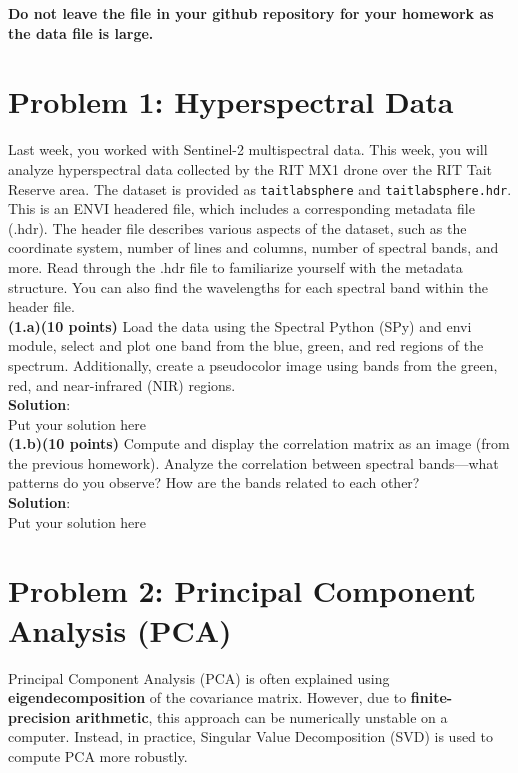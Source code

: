 \documentclass[12pt]{article}
\begin{document}
\noindent\textbf{Do not leave the file in your github repository for your homework as the data file is large.}

\section*{Problem 1: Hyperspectral Data}

Last week, you worked with Sentinel-2 multispectral data. This week, you will analyze hyperspectral data collected by the RIT MX1 drone over the RIT Tait Reserve area. The dataset is provided as \texttt{taitlabsphere} and \texttt{taitlabsphere.hdr}.\\

\noindent This is an ENVI headered file, which includes a corresponding metadata file (.hdr). The header file describes various aspects of the dataset, such as the coordinate system, number of lines and columns, number of spectral bands, and more. Read through the .hdr file to familiarize yourself with the metadata structure. You can also find the wavelengths for each spectral band within the header file. \\


\noindent\textbf{(1.a)(10 points)} Load the data using the Spectral Python (SPy) and envi module, select and plot one band from the blue, green, and red regions of the spectrum. Additionally, create a pseudocolor image using bands from the green, red, and near-infrared (NIR) regions.\\

\noindent\textbf{Solution}:\\
Put your solution here\\

\noindent\textbf{(1.b)(10 points)} Compute and display the correlation matrix as an image (from the previous homework). Analyze the correlation between spectral bands—what patterns do you observe? How are the bands related to each other?  \\

\noindent\textbf{Solution}:\\
Put your solution here\\

\section*{Problem 2: Principal Component Analysis (PCA)}

Principal Component Analysis (PCA) is often explained using \textbf{eigendecomposition} of the covariance matrix. However, due to \textbf{finite-precision arithmetic}, this approach can be numerically unstable on a computer. Instead, in practice, Singular Value Decomposition (SVD) is used to compute PCA more robustly.\\
\end{document}
